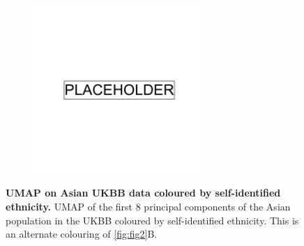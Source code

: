 \begin{figure}[ht]
    \centering
    \begin{subfigure}{\textwidth}
    \includegraphics[width=0.7\textwidth]{placeholder.png}
    \end{subfigure}
    \caption[UMAP on Asian UKBB data coloured by self-identified ethnicity]{\textbf{UMAP on Asian UKBB data coloured by self-identified ethnicity.} UMAP of the first 8 principal components of the Asian population in the UKBB coloured by self-identified ethnicity. This is an alternate colouring of \ref{fig:fig2}B.}
    \label{fig:supp_umap_ukbb_asian_eth}
\end{figure}

\newpage

